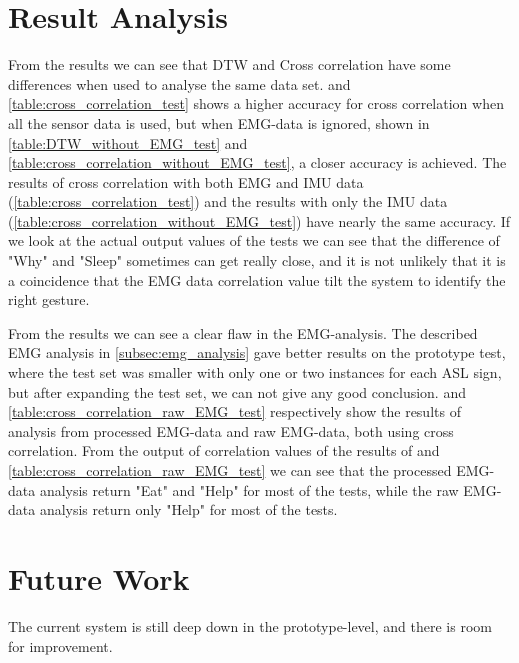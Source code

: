 \section{Result Analysis}
From the results we can see that DTW and Cross correlation have some differences when used to analyse the same data set.  and \ref{table:cross_correlation_test} shows a higher accuracy for cross correlation when all the sensor data is used, but when EMG-data is ignored, shown in \cref{table:DTW_without_EMG_test} and \ref{table:cross_correlation_without_EMG_test}, a closer accuracy is achieved. The results of cross correlation with both EMG and IMU data (\ref{table:cross_correlation_test}) and the results with only the IMU data (\ref{table:cross_correlation_without_EMG_test}) have nearly the same accuracy. If we look at the actual output values of the tests we can see that the difference of "Why" and "Sleep" sometimes can get really close, and it is not unlikely that it is a coincidence that the EMG data correlation value tilt the system to identify the right gesture. 

From the results we can see a clear flaw in the EMG-analysis. The described EMG analysis in \cref{subsec:emg_analysis} gave better results on the prototype test, where the test set was smaller with only one or two instances for each ASL sign, but after expanding the test set, we can not give any good conclusion.  and \ref{table:cross_correlation_raw_EMG_test} respectively show the results of analysis from processed EMG-data and raw EMG-data, both using cross correlation. From the output of correlation values of the results of  and \ref{table:cross_correlation_raw_EMG_test} we can see that the processed EMG-data analysis return "Eat" and "Help" for most of the tests, while the raw EMG-data analysis return only "Help" for most of the tests.



\section{Future Work}
The current system is still deep down in the prototype-level, and there is room for improvement.

